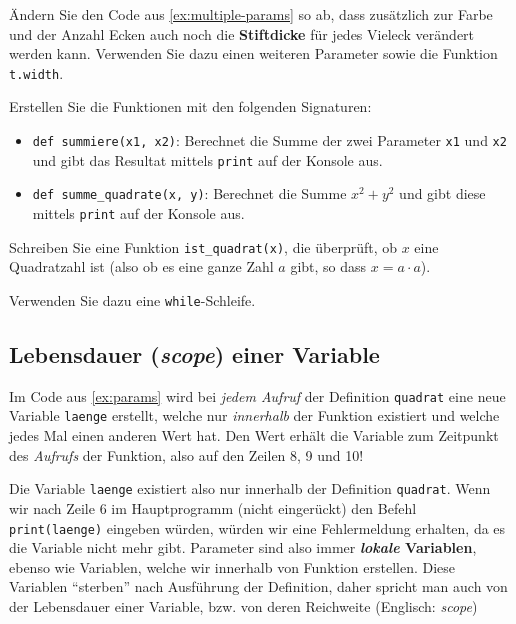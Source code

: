 \begin{myexercise}
	Ändern Sie den Code aus \cref{ex:multiple-params} so ab, dass zusätzlich zur Farbe und der Anzahl Ecken auch noch die \textbf{Stiftdicke} für jedes Vieleck verändert werden kann. Verwenden Sie dazu einen weiteren Parameter sowie die Funktion \lstinline|t.width|.
\end{myexercise}

\begin{myexercise}
	Erstellen Sie die Funktionen mit den folgenden Signaturen:
	\begin{itemize}
		\item \lstinline|def summiere(x1, x2)|: Berechnet die Summe der zwei Parameter \lstinline|x1| und \lstinline|x2| und gibt das Resultat mittels \lstinline|print| auf der Konsole aus.
		\item \lstinline|def summe_quadrate(x, y)|: Berechnet die Summe \(x^2 + y^2\) und gibt diese mittels \lstinline{print} auf der Konsole aus.
	\end{itemize}
\end{myexercise}

\begin{myexercise}
	Schreiben Sie eine Funktion \lstinline|ist_quadrat(x)|, die überprüft, ob $x$ eine Quadratzahl ist (also ob es eine ganze Zahl $a$ gibt, so dass $x = a \cdot a$).

	Verwenden Sie dazu eine \lstinline|while|-Schleife.

	\begin{myanswer}
		
	\end{myanswer}
\end{myexercise}
\newpage

\subsection{Lebensdauer (\textit{scope}) einer Variable}
Im Code aus \cref{ex:params} wird bei \textit{jedem Aufruf} der Definition \lstinline|quadrat| eine neue Variable \texttt{laenge} erstellt, welche nur \textit{innerhalb} der Funktion existiert und welche jedes Mal einen anderen Wert hat. Den Wert erhält die Variable zum Zeitpunkt des \textit{Aufrufs} der Funktion, also auf den Zeilen 8, 9 und 10!

Die Variable \lstinline|laenge| existiert also nur innerhalb der Definition \lstinline|quadrat|. Wenn wir nach Zeile 6 im Hauptprogramm (nicht eingerückt) den Befehl \lstinline|print(laenge)| eingeben würden, würden wir eine Fehlermeldung erhalten, da es die Variable nicht mehr gibt. Parameter sind also immer \textbf{\textit{lokale} Variablen}, ebenso wie Variablen, welche wir innerhalb von Funktion erstellen. Diese Variablen \enquote{sterben} nach Ausführung der Definition, daher spricht man auch von der Lebensdauer einer Variable, bzw. von deren Reichweite (Englisch: \textit{scope})

